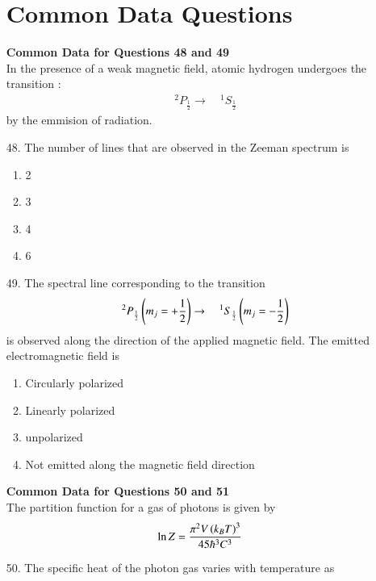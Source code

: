 \documentclass[journal,12pt,onecolumn]{IEEEtran}
\theoremstyle{remark}
\begin{document}
\begin{enumerate}
            \section{\textbf{Common Data Questions}}
            \textbf{Common Data for Questions 48 and 49}\\
            In the presence of a weak magnetic field, atomic hydrogen undergoes the transition :
            \begin{align}
                {\quad}^2 P_{\frac{1}{2}} \rightarrow {\quad}^1 S_{\frac{1}{2}}
            \end{align}
            by the emmision of radiation.
        \item[48.] The number of lines that are observed in the Zeeman spectrum is
            \hfill{}
            \begin{enumerate}
                \item 2
                \item 3
                \item 4
                \item 6
            \end{enumerate}
        \item[49.] The spectral line corresponding to the transition 
            \begin{align}
                {\quad}^2 P_{\frac{1}{2}}\left(m_j = + \frac{1}{2}\right) \rightarrow {\quad}^1 S_{\frac{1}{2}}\left(m_j = -\frac{1}{2}\right)
            \end{align}
            is observed along the direction of the applied magnetic field. The emitted electromagnetic
            field is
            \hfill{}
            \begin{enumerate}
                \item Circularly polarized
                \item Linearly polarized
                \item unpolarized
                \item Not emitted along the magnetic field direction
            \end{enumerate}
            \textbf{Common Data for Questions 50 and 51}\\
            The partition function for a gas of photons is given by
            \begin{align}
                \ln Z = \frac{\pi^2 V\left(k_B T\right)^3}{45\hbar ^3 C^3}
            \end{align}
        \item[50.] The specific heat of the photon gas varies with temperature as 
            \hfill{}
            \begin{enumerate}
                    \begin{multicols}{2}
                

\end{multicols}
\end{enumerate}
\end{enumerate}
\end{document}
